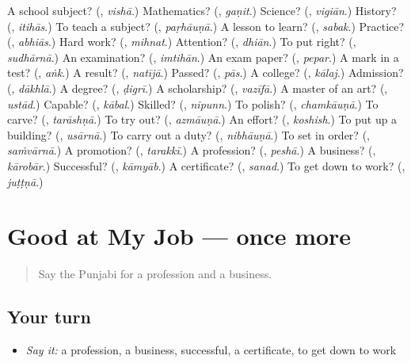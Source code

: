 \begin{tcolorbox}[breakable,colback=teal!4,colframe=teal!35!black,title={Before you move on}]
A school subject? (\textbf{}, \emph{vishā}.) Mathematics? (\textbf{}, \emph{gaṇit}.) Science? (\textbf{}, \emph{vigiān}.) History? (\textbf{}, \emph{itihās}.) To teach a subject? (\textbf{}, \emph{paṛhāuṇā}.) A lesson to learn? (\textbf{}, \emph{sabak}.) Practice? (\textbf{}, \emph{abhiās}.) Hard work? (\textbf{}, \emph{mihnat}.) Attention? (\textbf{}, \emph{dhiān}.) To put right? (\textbf{}, \emph{sudhārnā}.) An examination? (\textbf{}, \emph{imtihān}.) An exam paper? (\textbf{}, \emph{pepar}.) A mark in a test? (\textbf{}, \emph{aṅk}.) A result? (\textbf{}, \emph{natījā}.) Passed? (\textbf{}, \emph{pās}.) A college? (\textbf{}, \emph{kālaj}.) Admission? (\textbf{}, \emph{dākhlā}.) A degree? (\textbf{}, \emph{ḍigrī}.) A scholarship? (\textbf{}, \emph{vazīfā}.) A master of an art? (\textbf{}, \emph{ustād}.) Capable? (\textbf{}, \emph{kābal}.) Skilled? (\textbf{}, \emph{nipunn}.) To polish? (\textbf{}, \emph{chamkāuṇā}.) To carve? (\textbf{}, \emph{tarāshṇā}.) To try out? (\textbf{}, \emph{azmāuṇā}.) An effort? (\textbf{}, \emph{koshish}.) To put up a building? (\textbf{}, \emph{usārnā}.) To carry out a duty? (\textbf{}, \emph{nibhāuṇā}.) To set in order? (\textbf{}, \emph{saṁvārnā}.) A promotion? (\textbf{}, \emph{tarakkī}.) A profession? (\textbf{}, \emph{peshā}.) A business? (\textbf{}, \emph{kārobār}.) Successful? (\textbf{}, \emph{kāmyāb}.) A certificate? (\textbf{}, \emph{sanad}.) To get down to work? (\textbf{}, \emph{juṭṭṇā}.)
\end{tcolorbox}
\section[(dialogue)]{Good at My Job — once more}

\label{lesson:PA-R364-review-final-364}



\begin{quote}
Say the Punjabi for a profession and a business.
\end{quote}

\subsection*{Your turn}
\begin{itemize}
\raggedright
  \item \emph{Say it:} a profession, a business, successful, a certificate, to get down to work
\end{itemize}

